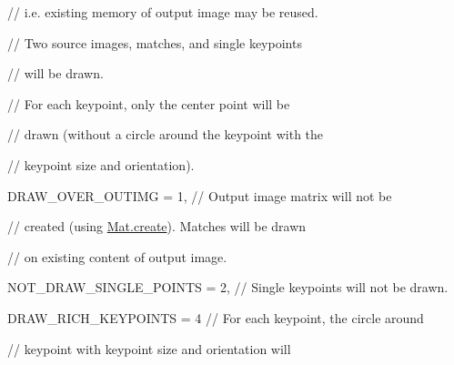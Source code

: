 {\ttfamily // i.\+e. existing memory of output image may be reused.}

{\ttfamily }

{\ttfamily }

{\ttfamily // Two source images, matches, and single keypoints}

{\ttfamily }

{\ttfamily }

{\ttfamily // will be drawn.}

{\ttfamily }

{\ttfamily }

{\ttfamily // For each keypoint, only the center point will be}

{\ttfamily }

{\ttfamily }

{\ttfamily // drawn (without a circle around the keypoint with the}

{\ttfamily }

{\ttfamily }

{\ttfamily // keypoint size and orientation).}

{\ttfamily }

{\ttfamily }

{\ttfamily D\+R\+A\+W\+\_\+\+O\+V\+E\+R\+\_\+\+O\+U\+T\+I\+MG = 1, // Output image matrix will not be}

{\ttfamily }

{\ttfamily }

{\ttfamily // created (using \mbox{\hyperlink{classorg_1_1opencv_1_1core_1_1_mat_a539b0a3690afb6b43047b50cbb787fee}{Mat.\+create}}). Matches will be drawn}

{\ttfamily }

{\ttfamily }

{\ttfamily // on existing content of output image.}

{\ttfamily }

{\ttfamily }

{\ttfamily N\+O\+T\+\_\+\+D\+R\+A\+W\+\_\+\+S\+I\+N\+G\+L\+E\+\_\+\+P\+O\+I\+N\+TS = 2, // Single keypoints will not be drawn.}

{\ttfamily }

{\ttfamily }

{\ttfamily D\+R\+A\+W\+\_\+\+R\+I\+C\+H\+\_\+\+K\+E\+Y\+P\+O\+I\+N\+TS = 4 // For each keypoint, the circle around}

{\ttfamily }

{\ttfamily }

{\ttfamily // keypoint with keypoint size and orientation will}

